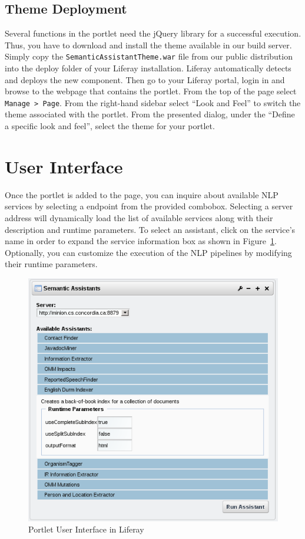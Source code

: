\subsection{Theme Deployment}
\label{sec:theme_deploy}
Several functions in the \sa portlet need the jQuery library for a successful execution. Thus, you have to download and install the \sa theme available in our build server. Simply copy the \texttt{SemanticAssistantTheme.war} file from our public distribution into the deploy folder of your Liferay installation. Liferay automatically detects and deploys the new component. Then go to your Liferay portal, login in and browse to the webpage that contains the \sa portlet. From the top of the page select \texttt{Manage \textgreater~Page}. From the right-hand sidebar select ``Look and Feel'' to switch the theme associated with the \sa portlet. From the presented dialog, under the ``Define a specific look and feel'', select the \sa theme for your portlet.

\section{User Interface}
Once the portlet is added to the page, you can inquire about available NLP services by selecting a \sa endpoint from the provided combobox. Selecting a server address will dynamically load the list of available services along with their description and runtime parameters. To select an assistant, click on the service's name in order to expand the service information box as shown in Figure~\ref{fig:liferay_sa_portlet}. Optionally, you can customize the execution of the NLP pipelines by modifying their runtime parameters.

\begin{figure}
\centering
\includegraphics[scale=0.7]{pictures/liferay_sa_portlet.png}
\caption{\sa Portlet User Interface in Liferay}
\label{fig:liferay_sa_portlet}
\end{figure}

